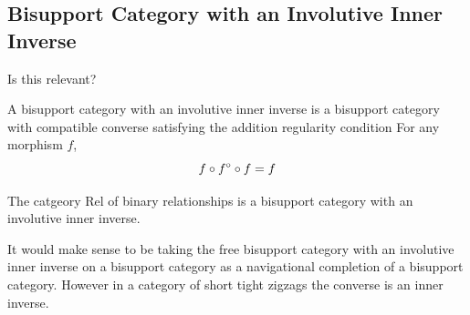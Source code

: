 \begin{aside}
\end{aside}

\subsection{Bisupport Category with an Involutive Inner Inverse}
\begin{aside}
Is this relevant?
\end{aside}

\begin{definition}
A bisupport category with an involutive inner inverse 
is a bisupport category with compatible converse satisfying the addition 
regularity condition
\noindent [K.5]\quad
For any morphism $f$,
\[
f \circ {f}^\circ \circ f =f
\]
\end{definition}

\begin{aside}
The catgeory Rel of binary relationships is a 
bisupport category with an involutive inner inverse.

It would make sense to be taking the free 
bisupport category with an involutive inner inverse on a bisupport category
as a navigational completion of a bisupport category.
However in a category of short tight zigzags the converse is  an inner inverse.
\end{aside}




